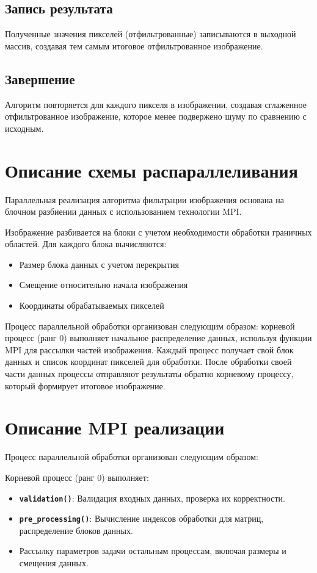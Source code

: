 \documentclass[14pt]{extarticle}
\theoremstyle{definition}
\theoremstyle{remark}
\begin{document}
\subsection{Запись результата}

Полученные значения пикселей (отфильтрованные) записываются в выходной массив, создавая тем самым итоговое отфильтрованное изображение.

\subsection{Завершение}

Алгоритм повторяется для каждого пикселя в изображении, создавая сглаженное отфильтрованное изображение, которое менее подвержено шуму по сравнению с исходным.

\clearpage
\section{Описание схемы распараллеливания}

Параллельная реализация алгоритма фильтрации изображения основана на блочном разбиении данных с использованием технологии MPI.

Изображение разбивается на блоки с учетом необходимости обработки граничных областей. Для каждого блока вычисляются:
\begin{itemize}
    \item Размер блока данных с учетом перекрытия
    \item Смещение относительно начала изображения
    \item Координаты обрабатываемых пикселей
\end{itemize}

Процесс параллельной обработки организован следующим образом: корневой процесс (ранг 0) выполняет начальное распределение данных, используя функции MPI для рассылки частей изображения. Каждый процесс получает свой блок данных и список координат пикселей для обработки. После обработки своей части данных процессы отправляют результаты обратно корневому процессу, который формирует итоговое изображение.

\clearpage
\section{Описание MPI реализации}
Процесс параллельной обработки организован следующим образом:

Корневой процесс (ранг 0) выполняет:
\begin{itemize}
    \item \textbf{\texttt{validation()}}: Валидация входных данных, проверка их корректности.
    \item \textbf{\texttt{pre\_processing()}}: Вычисление индексов обработки для матриц, распределение блоков данных.
    \item Рассылку параметров задачи остальным процессам, включая размеры и смещения данных.\\
\end{itemize}
\end{document}
